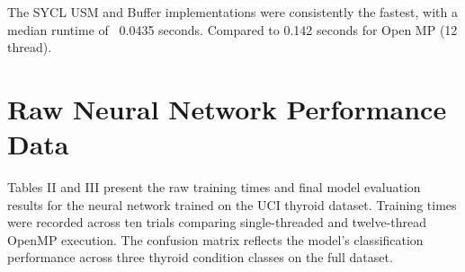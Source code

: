 \documentclass[journal]{IEEEtran}
\begin{document}
\begin{table}[H]
\centering
{\fontsize{14}{16}\selectfont
{}}
\caption{Execution Times (Seconds) for $1000x1000$ Matrix Multiplication Across Different Implementations (Release Mode, \texttt{-O2})}
\end{table}

The SYCL USM and Buffer implementations were consistently the fastest, with a median runtime of ~0.0435 seconds. Compared to 0.142 seconds for Open MP (12 thread).

\ifCLASSOPTIONcaptionsoff
  \newpage
\fi

\section{Raw Neural Network Performance Data}
Tables II and III present the raw training times and final model evaluation results for the neural network trained on the UCI thyroid dataset. Training times were recorded across ten trials comparing single-threaded and twelve-thread OpenMP execution. The confusion matrix reflects the model's classification performance across three thyroid condition classes on the full dataset.
\end{document}
